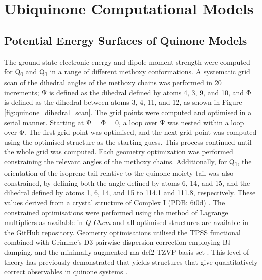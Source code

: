 \section{Ubiquinone Computational Models}

\subsection{Potential Energy Surfaces of Quinone Models}

The ground state electronic energy and dipole moment strength were computed for Q\textsubscript{0} and Q\textsubscript{1} in a range of different methoxy conformations. A systematic grid scan of the dihedral angles of the methoxy chains was performed in 20\degree{} increments; $\mathrm{\Psi}$ is defined as the dihedral defined by atoms 4, 3, 9, and 10, and $\mathrm{\Phi}$ is defined as the dihedral between atoms 3, 4, 11, and 12, as shown in Figure \ref{fig:quinone_dihedral_scan}. 
The grid points were computed and optimised in a serial manner. Starting at $\mathrm{\Psi=\Phi=}$0\degree, a loop over $\mathrm{\Psi}$ was nested within a loop over $\mathrm{\Phi}$. The first grid point was optimised, and the next grid point was computed using the optimised structure as the starting guess. This process continued until the whole grid was computed. Each geometry optimization was performed constraining the relevant angles of the methoxy chains. Additionally, for Q\textsubscript{1}, the orientation of the isoprene tail relative to the quinone moiety tail was also constrained, by defining both the angle defined by atoms 6, 14, and 15, and the dihedral defined by atoms 1, 6, 14, and 15 to 114.1\degree{} and 111.8\degree{}, respectively. These values derived from a crystal structure of Complex I (PDB: 6i0d) \cite{gutierrez2020key}. The constrained optimisations were performed using the method of Lagrange multipliers as available in \textit{Q-Chem} and all optimised structures are available in the \href{https://github.com/EliteSushi/TCCM_Thesis}{GitHub repository}. Geometry optimisations utilised the TPSS functional \cite{tao2003climbing} combined with Grimme's D3 pairwise dispersion correction \cite{grimme2011effect} employing BJ damping\cite{becke2005density}, and the minimally augmented ma-def2-TZVP basis set \cite{zheng2011minimally,weigend2005balanced}. This level of theory has previously demonstrated that yields structures that give quantitatively correct observables in quinone systems \cite{schulz2018systematic}.\\

